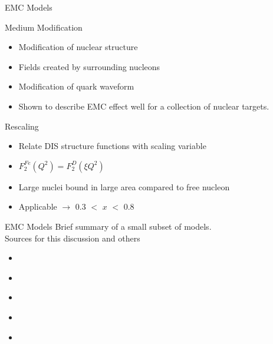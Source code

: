 \documentclass[12pt,usenames,dvipsnames]{beamer}
\begin{document}
\begin{frame}{EMC Models}
\vspace{-0.5cm}
	\begin{block}{Medium Modification}
		\begin{itemize}
			\item Modification of nuclear structure
			\item Fields created by surrounding nucleons
			\item Modification of quark waveform
			\item Shown to describe EMC effect well for a collection of nuclear targets.
		\end{itemize}
	\end{block}
\pause	
	\begin{block}{Rescaling}
		\begin{itemize}
			\item Relate DIS structure functions with scaling variable
			\item $F_2^{Fe}(Q^2) =F_2^{D}(\xi Q^2)$
			\item Large nuclei bound in large area compared to free nucleon
			\item Applicable $\rightarrow$ 0.3 $<$ $x$ $<$ 0.8 
		\end{itemize}
	\end{block}


\end{frame}


\begin{frame}{EMC Models}
\centering Brief summary of a small subset of models.\\
\centering Sources for this discussion and others
\vspace{1cm}
	\begin{itemize}
		\item \cite{EMC_medium_1}
		\item \cite{EMC_model_1}
		\item \cite{Geesaman} 
		\item \cite{Norton} 
		\item \cite{EMC_medium_2} 
	\end{itemize}
\end{frame}
\end{document}
